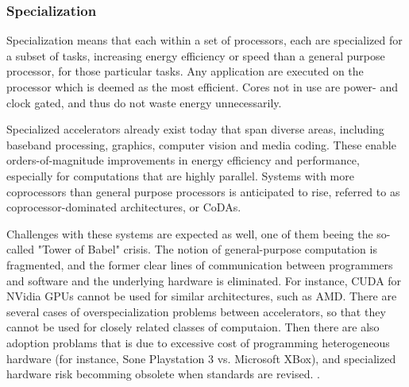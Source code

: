 
\subsubsection{Specialization}
Specialization means that each within a set of processors, each are specialized for a subset of tasks, increasing energy efficiency or speed than a general purpose processor, for those particular tasks.
Any application are executed on the processor which is deemed as the most efficient.
Cores not in use are power- and clock gated, and thus do not waste energy unnecessarily.

Specialized accelerators already exist today that span diverse areas, including baseband processing, graphics, computer vision and media coding.
These enable orders-of-magnitude improvements in energy efficiency and performance, especially for computations that are highly parallel.
Systems with more coprocessors than general purpose processors is anticipated to rise, referred to as coprocessor-dominated architectures, or CoDAs.

Challenges with these systems are expected as well, one of them beeing the so-called "Tower of Babel" crisis.
The notion of general-purpose computation is fragmented, and the former clear lines of communication between programmers and software and the underlying hardware is eliminated.
For instance, CUDA for NVidia GPUs cannot be used for similar architectures, such as AMD.
There are several cases of overspecialization problems between accelerators, so that they cannot be used for closely related classes of computaion.
Then there are also adoption problams that is due to excessive cost of programming heterogeneous hardware (for instance, Sone Playstation 3 vs. Microsoft XBox), and specialized hardware risk becomming obsolete when standards are revised. \cite{dark-silicon}.










